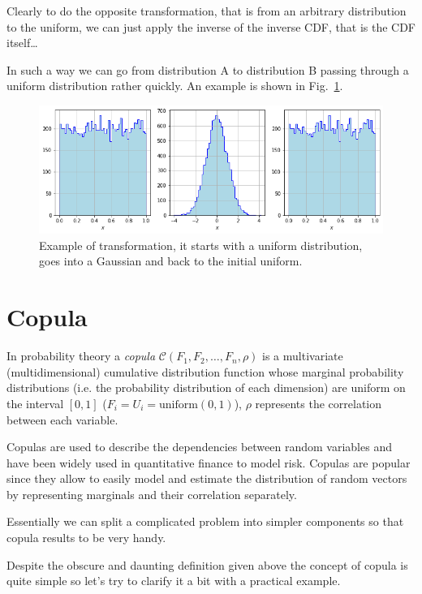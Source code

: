 Clearly to do the opposite transformation, that is from an arbitrary distribution
to the uniform, we can just apply the inverse of the inverse CDF, that is the CDF itself\ldots

In such a way we can go from distribution A to distribution B passing through 
a uniform distribution rather quickly. An example is shown in Fig.~\ref{fig:a_to_b_to_a}.

\begin{figure}[htbp]
	\centering
	\includegraphics[width=1.\textwidth]{figures/a_to_b_to_a}
	\caption{Example of transformation, it starts with a uniform distribution, 
		goes into a Gaussian and back to the initial uniform.}
	\label{fig:a_to_b_to_a}
\end{figure}

\section{Copula}\label{copula}

In probability theory a \emph{copula} $\mathcal{C}(F_1, F_2, \ldots, F_n, \rho)$
is a multivariate (multidimensional) cumulative distribution function
whose marginal probability distributions (i.e. the probability
distribution of each dimension) are uniform on the
interval $[0, 1]$ ($F_i = U_i =\mathrm{uniform}(0,1)$),
\(\rho\) represents the correlation between each variable.

Copulas are used to describe the dependencies between random variables and
have been widely used in quantitative finance to model risk. Copulas are popular since
they allow to easily model and estimate the distribution of random
vectors by representing marginals and their correlation separately.

Essentially we can split a complicated problem into simpler components so that 
copula results to be very handy.

Despite the obscure and daunting definition given above the concept of copula is
quite simple so let's try to clarify it a bit with a practical example.

